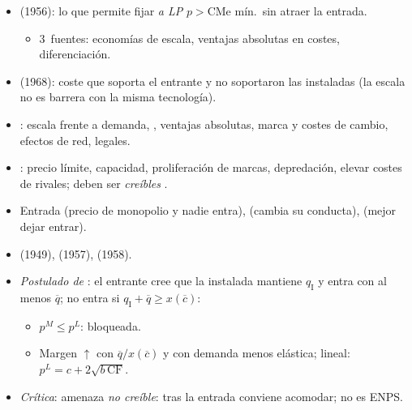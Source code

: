 \documentclass{article}
\begin{document}
\begin{columnas}
\begin{itemize}
\item {} (1956): lo que permite fijar \emph{a LP} $p>\mathrm{CMe}$ mín.\ sin atraer la entrada.
  \begin{itemize}
  \item 3~fuentes: economías de escala, ventajas absolutas en costes, diferenciación.
  \end{itemize}
\item {} (1968): coste que soporta el entrante y no soportaron las instaladas (la escala no es barrera con la misma tecnología).
\item {}: escala frente a demanda, , ventajas absolutas, marca y costes de cambio, efectos de red, legales.
\item {}: precio límite, capacidad, proliferación de marcas, depredación, elevar costes de rivales; deben ser \emph{creíbles} .
\item Entrada  (precio de monopolio y nadie entra),  (cambia su conducta),  (mejor dejar entrar).
\end{itemize}
\begin{itemize}
\item {} (1949),  (1957),  (1958).
\item \emph{Postulado de }: el entrante cree que la instalada mantiene $q_{\mathrm I}$ y entra con al menos $\overline{q}$; no entra si $q_{\mathrm I}+\overline{q}\geq x(\overline{c})$:
  \begin{itemize}
  \item $p^M\leq p^L$: bloqueada.
  \item Margen $\uparrow$ con $\overline{q}/x(\overline{c})$ y con demanda menos elástica; lineal: $p^L=c+2\sqrt{b\,\mathrm{CF}}$.
  \end{itemize}
\end{itemize}
\begin{itemize}
\item \emph{Crítica}: amenaza \emph{no creíble}: tras la entrada conviene acomodar; no es ENPS.

\end{itemize}
\end{columnas}
\end{document}
